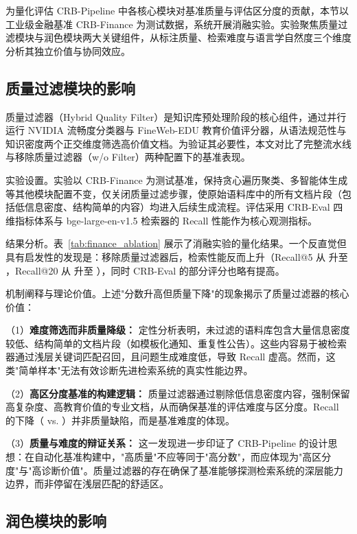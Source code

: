 为量化评估 CRB-Pipeline 中各核心模块对基准质量与评估区分度的贡献，本节以工业级金融基准 CRB-Finance 为测试数据，系统开展消融实验。实验聚焦质量过滤模块与润色模块两大关键组件，从标注质量、检索难度与语言学自然度三个维度分析其独立价值与协同效应。

\subsection{质量过滤模块的影响}
\label{subsec:filter_ablation}

质量过滤器（Hybrid Quality Filter）是知识库预处理阶段的核心组件，通过并行运行 NVIDIA 流畅度分类器与 FineWeb-EDU 教育价值评分器，从语法规范性与知识密度两个正交维度筛选高价值文档。为验证其必要性，本文对比了完整流水线与移除质量过滤器（w/o Filter）两种配置下的基准表现。

实验设置。实验以 CRB-Finance 为测试基准，保持贪心遍历聚类、多智能体生成等其他模块配置不变，仅关闭质量过滤步骤，使原始语料库中的所有文档片段（包括低信息密度、结构简单的内容）均进入后续生成流程。评估采用 CRB-Eval 四维指标体系与 bge-large-en-v1.5 检索器的 Recall 性能作为核心观测指标。

结果分析。表~\ref{tab:finance_ablation} 展示了消融实验的量化结果。一个反直觉但具有启发性的发现是：移除质量过滤器后，检索性能反而上升（Recall@5 从 \TBD{} 升至 \TBD{}，Recall@20 从 \TBD{} 升至 \TBD{}），同时 CRB-Eval 的部分评分也略有提高。


机制阐释与理论价值。上述"分数升高但质量下降"的现象揭示了质量过滤器的核心价值：

（1）\textbf{难度筛选而非质量降级：} 定性分析表明，未过滤的语料库包含大量信息密度较低、结构简单的文档片段（如模板化通知、重复性公告）。这些内容易于被检索器通过浅层关键词匹配召回，且问题生成难度低，导致 Recall 虚高。然而，这类"简单样本"无法有效诊断先进检索系统的真实性能边界。

（2）\textbf{高区分度基准的构建逻辑：} 质量过滤器通过剔除低信息密度内容，强制保留高复杂度、高教育价值的专业文档，从而确保基准的评估难度与区分度。Recall 的下降（ vs. ）并非质量缺陷，而是基准难度的体现。

（3）\textbf{质量与难度的辩证关系：} 这一发现进一步印证了 CRB-Pipeline 的设计思想：在自动化基准构建中，"高质量"不应等同于"高分数"，而应体现为"高区分度"与"高诊断价值"。质量过滤器的存在确保了基准能够探测检索系统的深层能力边界，而非停留在浅层匹配的舒适区。


\subsection{润色模块的影响}
\label{subsec:polisher_ablation}


